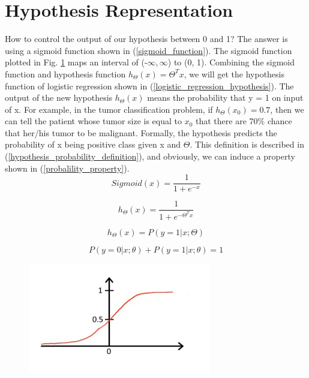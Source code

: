 \documentclass{article}
\begin{document}
\section{Hypothesis Representation}
How to control the output of our hypothesis between 0 and 1? The answer is using a sigmoid function shown in (\ref{sigmoid_function}). The sigmoid function plotted in Fig. \ref{sigmoid_function_plotting} maps an interval of (-$\infty, \infty$) to (0, 1). Combining the sigmoid function and hypothesis function $h_{\Theta}(x) = \Theta^{T}x$, we will get the hypothesis function of logistic regression shown in (\ref{logistic_regression_hypothesis}). The output of the new hypothesis $h_{\Theta}(x)$  means the probability that y = 1 on input of x. For example, in the tumor classification problem, if $h_{\Theta}(x_{0}) = 0.7$, then we can tell the patient whose tumor size is equal to $x_{0}$ that there are 70\% chance that her/his tumor to be malignant. Formally, the hypothesis predicts the probability of x being positive class given x and $\Theta$. This definition is described in (\ref{hypothesis_probability_definition}), and obviously, we can induce a property shown in (\ref{probalility_property}).
\begin{equation}\label{sigmoid_function}
Sigmoid(x) = \frac{1}{1 + e^{-x}}
\end{equation}

\begin{equation}\label{logistic_regression_hypothesis}
h_{\Theta}(x) = \frac{1}{1 + e^{-\Theta^{T}x}}
\end{equation}

\begin{equation}\label{hypothesis_probability_definition}
h_{\Theta}(x) = P(y = 1|x;\Theta)
\end{equation}

\begin{equation}\label{probalility_property}
P(y = 0|x;\theta) + P(y = 1|x;\theta) = 1
\end{equation}

\begin{figure}[ht]
  \centering
  \includegraphics[width=8cm]{Figure2.jpg}\\
  \caption{}\label{sigmoid_function_plotting}
\end{figure}
\end{document}

